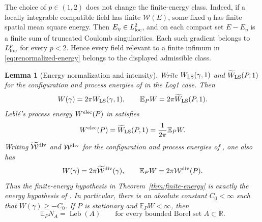 \documentclass[11pt,reqno]{amsart}
\numberwithin{equation}{section}
\newtheorem{lemma}[theorem]{Lemma}
\theoremstyle{definition}
\theoremstyle{remark}
\newcommand{\R}{\mathbb R}
\newcommand{\E}{\mathbb E}
\newcommand{\1}{\mathbf 1}
\newcommand{\Leb}{\operatorname{Leb}}
\begin{document}
The choice of $p\in(1,2)$ does not change the finite-energy class.
Indeed, if a locally integrable compatible field has finite
$\mathcal W(E)$, some fixed $\eta$ has finite spatial mean square
energy. Then $E_\eta\in L^2_{\rm loc}$, and on each compact set
$E-E_\eta$ is a finite sum of truncated Coulomb singularities. Each
such gradient belongs to $L^p_{\rm loc}$ for every $p<2$. Hence every
field relevant to a finite infimum in \eqref{eq:renormalized-energy}
belongs to the displayed admissible class.

\begin{samepage}
\begin{lemma}[Energy normalization and intensity]\label{lem:energy-input}
Write $W_{\rm LS}(\gamma,1)$ and $\widetilde W_{\rm LS}(P,1)$ for the
configuration and process energies of \cite[Sections~2.7.3--2.7.4]{LS}
in the Log1 case. Then
\begin{equation}\label{eq:energy-bridge}
W(\gamma)=2\pi W_{\rm LS}(\gamma,1),\qquad
\E_PW=2\pi\widetilde W_{\rm LS}(P,1).
\end{equation}
Lebl\'e's process energy $W^{\rm elec}(P)$ in
\cite[equations~(3.1)--(3.4)]{Leble} satisfies
\begin{equation}\label{eq:leble-energy-bridge}
W^{\rm elec}(P)=\widetilde W_{\rm LS}(P,1)
=\frac1{2\pi}\E_PW.
\end{equation}
Writing $\widetilde{\mathcal W}^{\rm div}$ and
$\mathcal W^{\rm div}$ for the configuration and process energies
of \cite[Definitions~2.5--2.6]{Assiotis}, one also has
\begin{equation}\label{eq:assiotis-energy}
W(\gamma)=2\pi\widetilde{\mathcal W}^{\rm div}(\gamma),\qquad
\E_PW=2\pi\mathcal W^{\rm div}(P).
\end{equation}
Thus the finite-energy hypothesis in Theorem~\ref{thm:finite-energy}
is exactly the energy hypothesis of \cite[Theorem~1.1]{Assiotis}.
In particular, there is an absolute constant $C_0<\infty$ such that
$W(\gamma)\ge-C_0$. If $P$ is stationary and $\E_PW<\infty$, then
\begin{equation}\label{eq:energy-intensity-conclusion}
\E_PN_A=\Leb(A)
\qquad\text{for every bounded Borel set }A\subset\R.
\end{equation}
\end{lemma}
\end{samepage}
\end{document}
